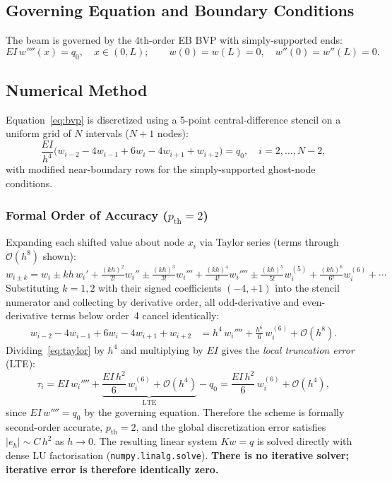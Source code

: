 \documentclass[11pt,letterpaper]{article}
\newcommand{\pth}{p_{\mathrm{th}}}
\newcommand{\EI}{EI}
\begin{document}
\subsection*{Governing Equation and Boundary Conditions}

The beam is governed by the 4th-order EB BVP with simply-supported ends:
\begin{equation}
  \EI\,w''''(x) = q_0,\quad x\in(0,L);
  \qquad
  w(0)=w(L)=0,\quad w''(0)=w''(L)=0.
  \label{eq:bvp}
\end{equation}

\subsection*{Numerical Method}

Equation~\eqref{eq:bvp} is discretized using a 5-point central-difference stencil
on a uniform grid of $N$ intervals ($N+1$ nodes):
\begin{equation}
  \frac{\EI}{h^4}\bigl(w_{i-2}-4w_{i-1}+6w_i-4w_{i+1}+w_{i+2}\bigr) = q_0,
  \quad i=2,\ldots,N-2,
  \label{eq:stencil}
\end{equation}
with modified near-boundary rows for the simply-supported ghost-node conditions.

\subsubsection*{Formal Order of Accuracy ($\pth=2$)}

Expanding each shifted value about node $x_i$ via Taylor series (terms
through $\mathcal{O}(h^8)$ shown):
\begin{equation}
  w_{i\pm k} = w_i \pm kh\,w_i' + \tfrac{(kh)^2}{2!}w_i''
               \pm \tfrac{(kh)^3}{3!}w_i'''
               + \tfrac{(kh)^4}{4!}w_i''''
               \pm \tfrac{(kh)^5}{5!}w_i^{(5)}
               + \tfrac{(kh)^6}{6!}w_i^{(6)} + \cdots
\end{equation}
Substituting $k=1,2$ with their signed coefficients $(-4, +1)$ into the
stencil numerator and collecting by derivative order, all odd-derivative
and even-derivative terms below order~4 cancel identically:
\begin{align}
  w_{i-2}-4w_{i-1}+6w_i-4w_{i+1}+w_{i+2}
  &= h^4\,w_i'''' + \frac{h^6}{6}\,w_i^{(6)} + \mathcal{O}(h^8).
  \label{eq:taylor}
\end{align}
Dividing~\eqref{eq:taylor} by $h^4$ and multiplying by $\EI$ gives the
\emph{local truncation error} (LTE):
\begin{equation}
  \tau_i = \EI\,w_i'''' + \underbrace{\frac{\EI\,h^2}{6}\,w_i^{(6)}
            + \mathcal{O}(h^4)}_{\text{LTE}} - q_0
         = \frac{\EI\,h^2}{6}\,w_i^{(6)} + \mathcal{O}(h^4),
\end{equation}
since $\EI\,w'''' = q_0$ by the governing equation.
Therefore the scheme is formally second-order accurate, $\pth = 2$, and the
global discretization error satisfies $|e_h| \sim C\,h^2$ as $h\to 0$.
The resulting linear system $Kw=q$ is solved directly with dense LU factorisation
(\texttt{numpy.linalg.solve}).  \textbf{There is no iterative solver;
iterative error is therefore identically zero.}
\end{document}

